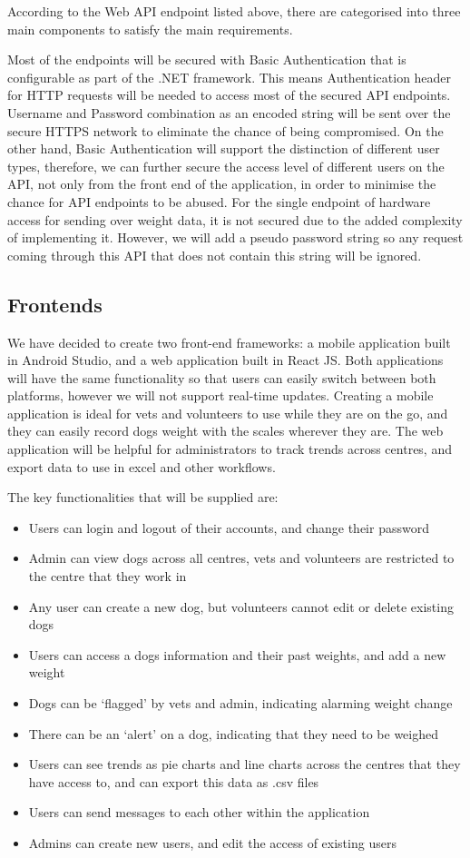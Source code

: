 According to the Web API endpoint listed above, there are categorised into three main components to satisfy the main requirements.

Most of the endpoints will be secured with Basic Authentication that is configurable as part of the .NET framework. This means Authentication header for HTTP requests will be needed to access most of the secured API endpoints. Username and Password combination as an encoded string will be sent over the secure HTTPS network to eliminate the chance of being compromised. On the other hand, Basic Authentication will support the distinction of different user types, therefore, we can further secure the access level of different users on the API, not only from the front end of the application, in order to minimise the chance for API endpoints to be abused. For the single endpoint of hardware access for sending over weight data, it is not secured due to the added complexity of implementing it. However, we will add a pseudo password string so any request coming through this API that does not contain this string will be ignored.

\subsection{Frontends}
We have decided to create two front-end frameworks: a mobile application built in Android Studio, and a web application built in React JS. Both applications will have the same functionality so that users can easily switch between both platforms, however we will not support real-time updates. Creating a mobile application is ideal for vets and volunteers to use while they are on the go, and they can easily record dogs weight with the scales wherever they are. The web application will be helpful for administrators to track trends across centres, and export data to use in excel and other workflows. 

The key functionalities that will be supplied are:
\begin{itemize}
  \item Users can login and logout of their accounts, and change their password
  \item Admin can view dogs across all centres, vets and volunteers are restricted to the centre that they work in
  \item Any user can create a new dog, but volunteers cannot edit or delete existing dogs
  \item Users can access a dogs information and their past weights, and add a new weight
  \item Dogs can be ‘flagged’ by vets and admin, indicating alarming weight change
  \item There can be an ‘alert’ on a dog, indicating that they need to be weighed
  \item Users can see trends as pie charts and line charts across the centres that they have access to, and can export this data as .csv files
  \item Users can send messages to each other within the application
  \item Admins can create new users, and edit the access of existing users
 \end{itemize}
 
